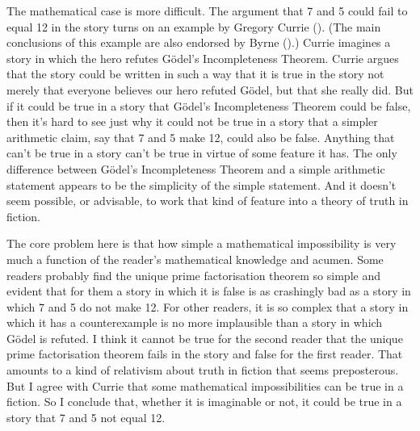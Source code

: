 \documentclass[
  11pt,
  letterpaper,
  DIV=11,
  numbers=noendperiod,
  twoside]{scrartcl}
\begin{document}
The mathematical case is more difficult. The argument that 7 and 5 could
fail to equal 12 in the story turns on an example by Gregory Currie
(). (The main conclusions of this example
are also endorsed by Byrne ().) Currie
imagines a story in which the hero refutes Gödel's Incompleteness
Theorem. Currie argues that the story could be written in such a way
that it is true in the story not merely that everyone believes our hero
refuted Gödel, but that she really did. But if it could be true in a
story that Gödel's Incompleteness Theorem could be false, then it's hard
to see just why it could not be true in a story that a simpler
arithmetic claim, say that 7 and 5 make 12, could also be false.
Anything that can't be true in a story can't be true in virtue of some
feature it has. The only difference between Gödel's Incompleteness
Theorem and a simple arithmetic statement appears to be the simplicity
of the simple statement. And it doesn't seem possible, or advisable, to
work that kind of feature into a theory of truth in fiction.

The core problem here is that how simple a mathematical impossibility is
very much a function of the reader's mathematical knowledge and acumen.
Some readers probably find the unique prime factorisation theorem so
simple and evident that for them a story in which it is false is as
crashingly bad as a story in which 7 and 5 do not make 12. For other
readers, it is so complex that a story in which it has a counterexample
is no more implausible than a story in which Gödel is refuted. I think
it cannot be true for the second reader that the unique prime
factorisation theorem fails in the story and false for the first reader.
That amounts to a kind of relativism about truth in fiction that seems
preposterous. But I agree with Currie that some mathematical
impossibilities can be true in a fiction. So I conclude that, whether it
is imaginable or not, it could be true in a story that 7 and 5 not equal
12.
\end{document}
